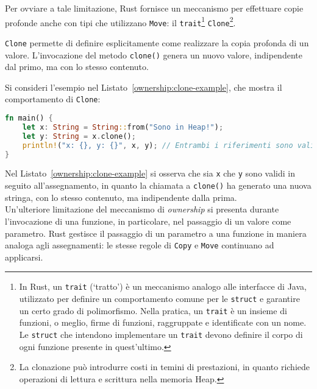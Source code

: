 Per ovviare a tale limitazione, Rust fornisce un meccanismo per effettuare copie profonde anche con tipi che utilizzano \texttt{Move}: il \texttt{trait}\footnote{In Rust, un \texttt{trait} (`tratto') è un meccanismo analogo alle interfacce di Java, utilizzato per definire un comportamento comune per le \texttt{struct} e garantire un certo grado di polimorfismo. Nella pratica, un \texttt{trait} è un insieme di funzioni, o meglio, firme di funzioni, raggruppate e identificate con un nome. Le \texttt{struct} che intendono implementare un \texttt{trait} devono definire il corpo di ogni funzione presente in quest'ultimo.} \texttt{Clone}\footnote{La clonazione può introdurre costi in temini di prestazioni, in quanto richiede operazioni di lettura e scrittura nella memoria Heap.}.

\texttt{Clone} permette di definire esplicitamente come realizzare la copia profonda di un valore. L'invocazione del metodo \texttt{clone()} genera un nuovo valore, indipendente dal primo, ma con lo stesso contenuto.

Si consideri l'esempio nel Listato~\ref{ownership:clone-example}, che mostra il comportamento di \texttt{Clone}:\hfill
\begin{lstlisting}[language=Rust, caption={Comportamento di Clone}, label={ownership:clone-example}]
fn main() {
    let x: String = String::from("Sono in Heap!");
    let y: String = x.clone();
    println!("x: {}, y: {}", x, y); // Entrambi i riferimenti sono validi
}
\end{lstlisting}
Nel Listato~\ref{ownership:clone-example} si osserva che sia \texttt{x} che \texttt{y} sono validi in seguito all'assegnamento, in quanto la chiamata a \texttt{clone()} ha generato una nuova stringa, con lo stesso contenuto, ma indipendente dalla prima. \hfill
\vspace{10pt}\\
\noindent Un'ulteriore limitazione del meccanismo di \textit{ownership} si presenta durante l'invocazione di una funzione, in particolare, nel passaggio di un valore come parametro.
Rust gestisce il passaggio di un parametro a una funzione in maniera analoga agli assegnamenti: le stesse regole di \texttt{Copy} e \texttt{Move} continuano ad applicarsi.

